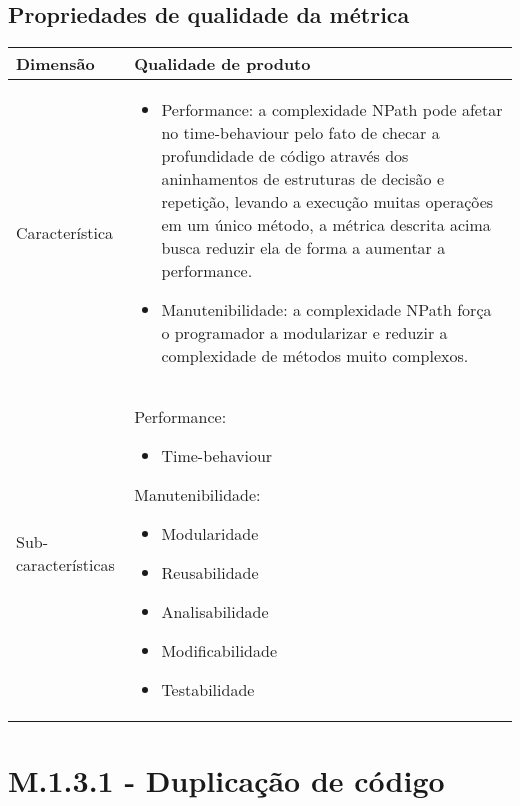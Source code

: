 	\subsection{Propriedades de qualidade da métrica}

	\begin{tabular}{ |p{4cm}|p{8cm}| }
	\hline
		Dimensão 		& 	Qualidade de produto	 \\
	 \hline
	 Característica 		& 	\begin{itemize} \item Performance: a complexidade NPath pode afetar no time-behaviour pelo fato de checar a profundidade de código através dos aninhamentos de estruturas de decisão e repetição, levando a execução muitas operações em um único método, a métrica descrita acima busca reduzir ela de forma a aumentar a performance. \item Manutenibilidade: a complexidade NPath força o programador a modularizar e reduzir a complexidade de métodos muito complexos. \end{itemize}	 \\
	 \hline
	 Sub-características 		& 	Performance: \begin{itemize}	\item Time-behaviour \end{itemize} Manutenibilidade: \begin{itemize} \item Modularidade \item Reusabilidade \item Analisabilidade \item Modificabilidade \item Testabilidade \end{itemize} \\
	 \hline
	\end{tabular}

\section{M.1.3.1 - Duplicação de código} 

